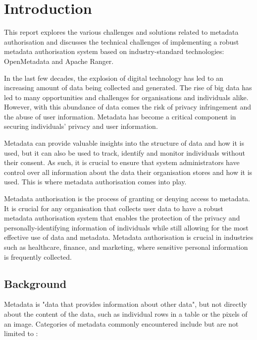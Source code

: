 \chapter{Introduction}
\label{cha:intro}

This report explores the various challenges and solutions related to metadata authorisation and discusses the technical challenges of implementing a robust metadata authorisation system based on industry-standard technologies: OpenMetadata and Apache Ranger.

In the last few decades, the explosion of digital technology has led to an increasing amount of data being collected and generated. The rise of big data has led to many opportunities and challenges for organisations and individuals alike. However, with this abundance of data comes the risk of privacy infringement and the abuse of user information. Metadata has become a critical component in securing individuals' privacy and user information.

Metadata can provide valuable insights into the structure of data and how it is used, but it can also be used to track, identify and monitor individuals without their consent. As such, it is crucial to ensure that system administrators have control over all information about the data their organisation stores and how it is used. This is where metadata authorisation comes into play.

Metadata authorisation is the process of granting or denying access to metadata. It is crucial for any organisation that collects user data to have a robust metadata authorisation system that enables the protection of the privacy and personally-identifying information of individuals while still allowing for the most effective use of data and metadata. Metadata authorisation is crucial in industries such as healthcare, finance, and marketing, where sensitive personal information is frequently collected.

 \section{Background}

 Metadata is "data that provides information about other data", but not directly about the content of the data, such as individual rows in a table or the pixels of an image. Categories of metadata commonly encountered include but are not limited to \cite{understandingMetadataRiley2017}:

